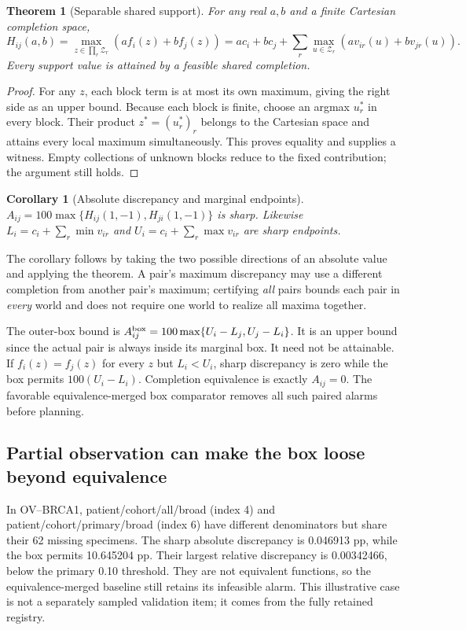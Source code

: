 \documentclass[10pt,letterpaper]{article}
\newtheorem{theorem}{Theorem}
\newtheorem{corollary}{Corollary}
\begin{document}
\begin{theorem}[Separable shared support]
For any real $a,b$ and a finite Cartesian completion space,
\[
 H_{ij}(a,b)=\max_{z\in\prod_r\mathcal Z_r}(af_i(z)+bf_j(z))
 =ac_i+bc_j+\sum_r\max_{u\in\mathcal Z_r}(av_{ir}(u)+bv_{jr}(u)).
\]
Every support value is attained by a feasible shared completion.
\end{theorem}
\begin{proof}
For any $z$, each block term is at most its own maximum, giving the right side as an upper bound. Because each block is finite, choose an argmax $u_r^*$ in every block. Their product $z^*=(u_r^*)_r$ belongs to the Cartesian space and attains every local maximum simultaneously. This proves equality and supplies a witness. Empty collections of unknown blocks reduce to the fixed contribution; the argument still holds.
\end{proof}

\begin{corollary}[Absolute discrepancy and marginal endpoints]
$A_{ij}=100\max\{H_{ij}(1,-1),H_{ji}(1,-1)\}$ is sharp. Likewise $L_i=c_i+\sum_r\min v_{ir}$ and $U_i=c_i+\sum_r\max v_{ir}$ are sharp endpoints.
\end{corollary}
The corollary follows by taking the two possible directions of an absolute value and applying the theorem. A pair's maximum discrepancy may use a different completion from another pair's maximum; certifying \emph{all} pairs bounds each pair in \emph{every} world and does not require one world to realize all maxima together.

The outer-box bound is $A^{\rm box}_{ij}=100\max\{U_i-L_j,U_j-L_i\}$. It is an upper bound since the actual pair is always inside its marginal box. It need not be attainable. If $f_i(z)=f_j(z)$ for every $z$ but $L_i<U_i$, sharp discrepancy is zero while the box permits $100(U_i-L_i)$. Completion equivalence is exactly $A_{ij}=0$. The favorable equivalence-merged box comparator removes all such paired alarms before planning.

\subsection{Partial observation can make the box loose beyond equivalence}
In OV--BRCA1, patient/cohort/all/broad (index 4) and patient/cohort/primary/broad (index 6) have different denominators but share their 62 missing specimens. The sharp absolute discrepancy is 0.046913 pp, while the box permits 10.645204 pp. Their largest relative discrepancy is 0.00342466, below the primary 0.10 threshold. They are not equivalent functions, so the equivalence-merged baseline still retains its infeasible alarm. This illustrative case is not a separately sampled validation item; it comes from the fully retained registry.
\end{document}
